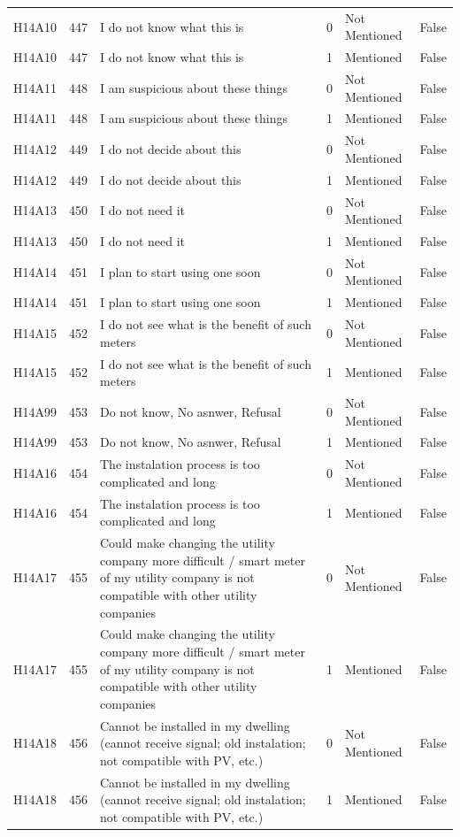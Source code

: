 \begin{tabular}{lrlllr}
H14A10 & 447 & I do not know what this is & 0 & Not Mentioned & False \\
H14A10 & 447 & I do not know what this is & 1 & Mentioned & False \\
H14A11 & 448 & I am suspicious about these things & 0 & Not Mentioned & False \\
H14A11 & 448 & I am suspicious about these things & 1 & Mentioned & False \\
H14A12 & 449 & I do not decide about this & 0 & Not Mentioned & False \\
H14A12 & 449 & I do not decide about this & 1 & Mentioned & False \\
H14A13 & 450 & I do not need it & 0 & Not Mentioned & False \\
H14A13 & 450 & I do not need it & 1 & Mentioned & False \\
H14A14 & 451 & I plan to start using one soon & 0 & Not Mentioned & False \\
H14A14 & 451 & I plan to start using one soon & 1 & Mentioned & False \\
H14A15 & 452 & I do not see what is the benefit of such meters & 0 & Not Mentioned & False \\
H14A15 & 452 & I do not see what is the benefit of such meters & 1 & Mentioned & False \\
H14A99 & 453 & Do not know, No asnwer, Refusal & 0 & Not Mentioned & False \\
H14A99 & 453 & Do not know, No asnwer, Refusal & 1 & Mentioned & False \\
H14A16 & 454 & The instalation process is too complicated and long & 0 & Not Mentioned & False \\
H14A16 & 454 & The instalation process is too complicated and long & 1 & Mentioned & False \\
H14A17 & 455 & Could make changing the utility company more difficult / smart meter of my utility company is not compatible with other utility companies & 0 & Not Mentioned & False \\
H14A17 & 455 & Could make changing the utility company more difficult / smart meter of my utility company is not compatible with other utility companies & 1 & Mentioned & False \\
H14A18 & 456 & Cannot be installed in my dwelling (cannot receive signal; old instalation; not compatible with PV, etc.) & 0 & Not Mentioned & False \\
H14A18 & 456 & Cannot be installed in my dwelling (cannot receive signal; old instalation; not compatible with PV, etc.) & 1 & Mentioned & False \\

\end{tabular}
